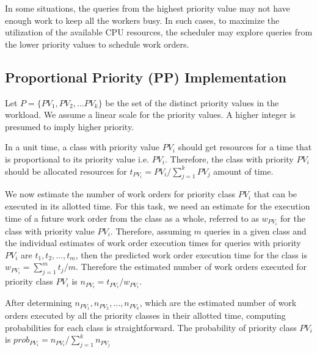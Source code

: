 
In some situations, the queries from the highest priority value may not have enough work to keep all the workers busy. 
In such cases, to maximize the utilization of the available CPU resources, the 
scheduler may explore queries from the lower priority values to schedule work orders.
\subsection{Proportional Priority (PP) Implementation}\label{ssec:proportional-priority}
Let $P = \{PV_{1}, PV_{2}, \ldots PV_{k}\}$ be the set of the distinct priority values 
in the workload. 
We assume a linear scale for the priority values. 
A higher integer is presumed to imply higher priority.

In a unit time, a class with priority value $PV_{i}$ should get resources for a time that is 
proportional to its priority value i.e. $PV_{i}$. 
Therefore, the class with priority $PV_{i}$ should be allocated resources for 
$t_{PV_{i}} = PV_{i}/\sum\limits_{j = 1}^{k}PV_{j}$ amount of time. 

We now estimate the number of work orders for priority class $PV_{i}$ that can be executed in its allotted time. 
For this task, we need an estimate for the execution time of a future work order from the class as a whole, referred to as $w_{PV_{i}}$ for the class with priority value $PV_{i}$.
Therefore, assuming $m$ queries in a given class and the individual estimates of 
work order execution times for queries with priority $PV_{i}$ are $t_{1}, t_{2}, \ldots, t_{m}$, then the predicted work order execution time for the class is $w_{PV_{i}} = \sum\limits_{j = 1}^{m}t_{j}/m$.
Therefore the estimated number of work orders executed for priority class $PV_{i}$ is
$n_{PV_{i}} = t_{PV_{i}} / w_{PV_{i}}$.

After determining $n_{PV_{1}}, n_{PV_{2}}, \ldots, n_{PV_{k}}$, which are the 
estimated number of work orders executed by all the priority classes in their allotted
time, computing probabilities for each class is straightforward.
The probability of priority class $PV_{i}$ is 
$prob_{PV_{i}} = n_{PV_{i}}/\sum\limits_{j = 1}^{k}n_{PV_{j}}$

